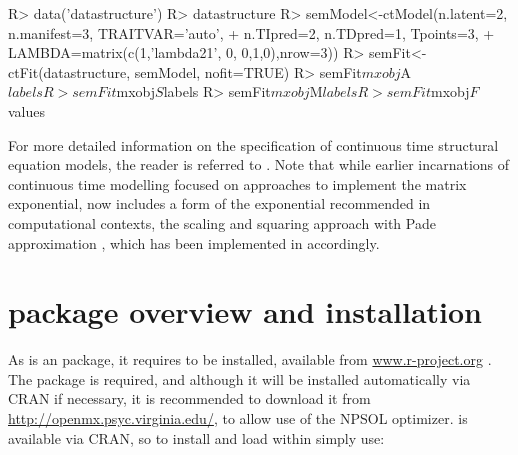 \documentclass[nojss]{jss}\usepackage[]{graphicx}\usepackage[]{color}
\begin{document}
\begin{Schunk}
\begin{Sinput}
R> data('datastructure')
R> datastructure
R> semModel<-ctModel(n.latent=2, n.manifest=3, TRAITVAR='auto', 
+   n.TIpred=2, n.TDpred=1, Tpoints=3, 
+   LAMBDA=matrix(c(1,'lambda21', 0, 0,1,0),nrow=3))
R> semFit<-ctFit(datastructure, semModel, nofit=TRUE)
R> semFit$mxobj$A$labels
R> semFit$mxobj$S$labels
R> semFit$mxobj$M$labels
R> semFit$mxobj$F$values
\end{Sinput}
\end{Schunk}

% 
% 
% 
% 
For more detailed information on the specification of continuous time structural equation models, the reader is referred to \citet{oud2000continuous, arnold1974stochastic, singer1998continuous, voelkle2012sem}. Note that while earlier incarnations of continuous time modelling focused on approaches to implement the matrix exponential,  now includes a form of the exponential recommended in computational contexts, the scaling and squaring approach with Pade approximation \citep{higham2009scaling}, which has been implemented in  accordingly.

\section[ctsem package overview and installation]{ package overview and installation} \label{sec:ctsemoverview}\nopagebreak
As  is an  package, it requires  to be installed, available from \url{www.r-project.org} \citep{rcoreteam2014r}. 
The  package  \citep{neale2015openmx} is required, and although it will be installed automatically via CRAN if necessary, it is recommended to download it from \url{http://openmx.psyc.virginia.edu/}, to allow use of the NPSOL optimizer. 
 is available via CRAN, so to install and load  within  simply use:
\end{document}

